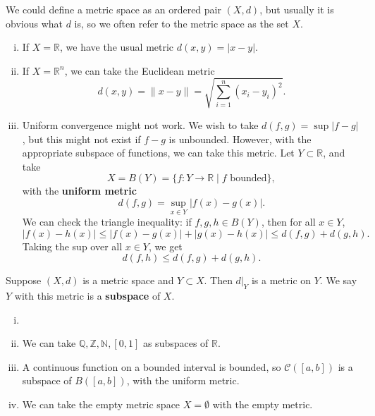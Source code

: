 \documentclass[12pt]{article}
\begin{document}
We could define a metric space as an ordered pair $(X, d)$, but usually it is obvious what $d$ is, so we often refer to the metric space as the set $X$.

\begin{exbox}
	\begin{enumerate}[(i)]
		\item If $X = \mathbb{R}$, we have the usual metric $d(x, y) = |x - y|$.
		\item If $X = \mathbb{R}^{n}$, we can take the Euclidean metric
			\[
				d(x, y) = \|x - y\| = \sqrt{\sum_{i = 1}^{n}(x_{i} - y_i)^2}
			.\]
		\item Uniform convergence might not work. We wish to take $d(f, g) = \sup|f - g|$, but this might not exist if $f - g$ is unbounded. However, with the appropriate subspace of functions, we can take this metric. Let $Y \subset \mathbb{R}$, and take
			\[
				X = B(Y) = \{f : Y \to \mathbb{R} \mid f \text{ bounded}\}
			,\]
			with the \textbf{uniform metric}
			\[
				d(f, g) = \sup_{x \in Y}|f(x) - g(x)|
			.\]
			We can check the triangle inequality: if $f, g, h \in B(Y)$, then for all $x \in Y$,
			\[
				|f(x) - h(x)| \leq |f(x) - g(x)| + |g(x) - h(x)| \leq d(f, g) + d(g, h)
			.\]
			Taking the sup over all $x \in Y$, we get
			\[
				d(f, h) \leq d(f, g) + d(g, h)
			.\]
	\end{enumerate}
\end{exbox}

\begin{remark}
	Suppose $(X, d)$ is a metric space and $Y \subset X$. Then $d|_{Y}$ is a metric on $Y$. We say $Y$ with this metric is a \textbf{subspace} of $X$.
\end{remark}

\begin{exbox}
	\begin{enumerate}[(i)]
		\item[]
		\item We can take $\mathbb{Q}, \mathbb{Z}, \mathbb{N}, [0, 1]$ as subspaces of $\mathbb{R}$.
		\item A continuous function on a bounded interval is bounded, so $\mathcal{C}([a, b])$ is a subspace of $B([a, b])$, with the uniform metric.
		\item We can take the empty metric space $X = \emptyset$ with the empty metric.
	\end{enumerate}
\end{exbox}
\end{document}
